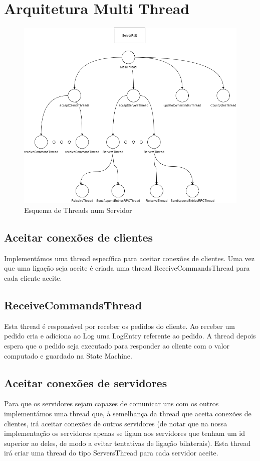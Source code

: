 \documentclass[12pt,a4paper]{report}
\begin{document}
\section{Arquitetura Multi Thread}
\begin{figure}[h]
\centering
\includegraphics[scale=0.5]{ThreadDiagram.png} 
\caption{Esquema de Threads num Servidor}
\end{figure}
\subsection{Aceitar conexões de clientes}
Implementámos uma thread específica para aceitar conexões de clientes. Uma vez que uma ligação seja aceite é criada uma thread ReceiveCommandsThread para cada cliente aceite.
\subsection{ReceiveCommandsThread}
Esta thread é responsável por receber os pedidos do cliente. Ao receber um pedido cria e adiciona ao Log uma LogEntry referente ao pedido. A thread depois espera que o pedido seja executado para responder ao cliente com o valor computado e guardado na State Machine.
\subsection{Aceitar conexões de servidores}
Para que os servidores sejam capazes de comunicar uns com os outros implementámos uma thread que, à semelhança da thread que aceita conexões de clientes, irá aceitar conexões de outros servidores (de notar que na nossa implementação os servidores apenas se ligam aos servidores que tenham um id superior ao deles, de modo a evitar tentativas de ligação bilaterais). Esta thread irá criar uma thread do tipo ServersThread para cada servidor aceite.
\end{document}
